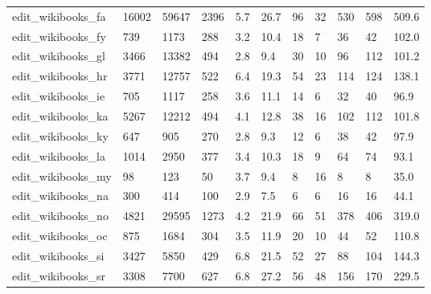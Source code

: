 \begin{longtable}{lllllllllll}
 edit\_wikibooks\_fa                                  & 16002      & 59647     & 2396  & 5.7    & 26.7   & 96    & 32     & 530    & 598    & 509.6   \\
 edit\_wikibooks\_fy                                  & 739        & 1173      & 288   & 3.2    & 10.4   & 18    & 7      & 36     & 42     & 102.0   \\
 edit\_wikibooks\_gl                                  & 3466       & 13382     & 494   & 2.8    & 9.4    & 30    & 10     & 96     & 112    & 101.2   \\
 edit\_wikibooks\_hr                                  & 3771       & 12757     & 522   & 6.4    & 19.3   & 54    & 23     & 114    & 124    & 138.1   \\
 edit\_wikibooks\_ie                                  & 705        & 1117      & 258   & 3.6    & 11.1   & 14    & 6      & 32     & 40     & 96.9    \\
 edit\_wikibooks\_ka                                  & 5267       & 12212     & 494   & 4.1    & 12.8   & 38    & 16     & 102    & 112    & 101.8   \\
 edit\_wikibooks\_ky                                  & 647        & 905       & 270   & 2.8    & 9.3    & 12    & 6      & 38     & 42     & 97.9    \\
 edit\_wikibooks\_la                                  & 1014       & 2950      & 377   & 3.4    & 10.3   & 18    & 9      & 64     & 74     & 93.1    \\
 edit\_wikibooks\_my                                  & 98         & 123       & 50    & 3.7    & 9.4    & 8     & 16     & 8      & 8      & 35.0    \\
 edit\_wikibooks\_na                                  & 300        & 414       & 100   & 2.9    & 7.5    & 6     & 6      & 16     & 16     & 44.1    \\
 edit\_wikibooks\_no                                  & 4821       & 29595     & 1273  & 4.2    & 21.9   & 66    & 51     & 378    & 406    & 319.0   \\
 edit\_wikibooks\_oc                                  & 875        & 1684      & 304   & 3.5    & 11.9   & 20    & 10     & 44     & 52     & 110.8   \\
 edit\_wikibooks\_si                                  & 3427       & 5850      & 429   & 6.8    & 21.5   & 52    & 27     & 88     & 104    & 144.3   \\
 edit\_wikibooks\_sr                                  & 3308       & 7700      & 627   & 6.8    & 27.2   & 56    & 48     & 156    & 170    & 229.5   \\

\end{longtable}
